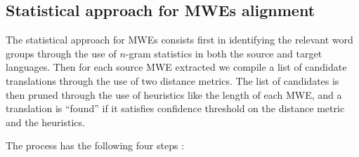 \documentclass[output=paper,modfonts,nonflat]{langsci/langscibook}
\begin{document}
\subsection{Statistical approach for MWEs alignment}

The statistical approach for MWEs  consists first in identifying the relevant word groups through the use of $n$-gram statistics in both the source and target languages. 
Then for each source MWE extracted we compile a list of candidate translations through the use of two distance metrics. 
The list of candidates is then pruned through the use of heuristics like the length of each MWE, and a translation is ``found'' if it satisfies confidence threshold on the distance metric and the heuristics.

The  process has the following four steps \citep{semmar2010hybrid}:
\end{document}
